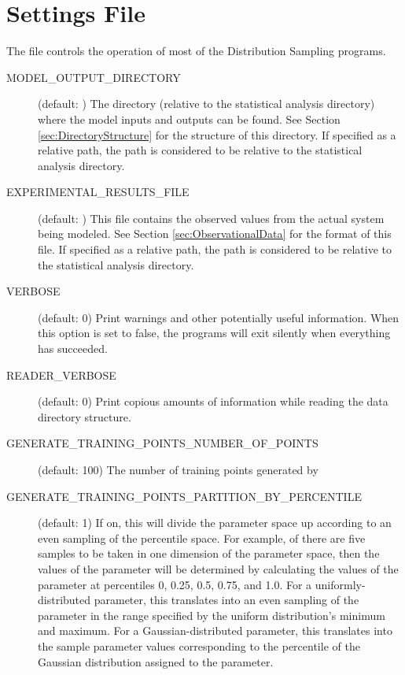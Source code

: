 
\section{Settings File}\label{sec:settings}

The file  controls the operation of most of the Distribution Sampling programs.

\begin{description}
    \item[MODEL\_OUTPUT\_DIRECTORY] (default: ) The directory (relative to the statistical analysis directory) where the model inputs and outputs can be found. See Section \ref{sec:DirectoryStructure} for the structure of this directory. If specified as a relative path, the path is considered to be relative to the statistical analysis directory.

    \item[EXPERIMENTAL\_RESULTS\_FILE] (default: ) This file contains the observed values from the actual system being modeled. See Section \ref{sec:ObservationalData} for the format of this file. If specified as a relative path, the path is considered to be relative to the statistical analysis directory.

    \item[VERBOSE] (default: 0) Print warnings and other potentially useful information. When this option is set to false, the programs will exit silently when everything has succeeded.

    \item[READER\_VERBOSE] (default: 0) Print copious amounts of information while reading the data directory structure.

    \item[GENERATE\_TRAINING\_POINTS\_NUMBER\_OF\_POINTS] (default: 100) The number of training points generated by 

    \item[GENERATE\_TRAINING\_POINTS\_PARTITION\_BY\_PERCENTILE] (default: 1) If on, this will divide the parameter space up according to an even sampling of the percentile space. For example, of there are five samples to be taken in one dimension of the parameter space, then the values of the parameter will be determined by calculating the values of the parameter at percentiles 0, 0.25, 0.5, 0.75, and 1.0. For a uniformly-distributed parameter, this translates into an even sampling of the parameter in the range specified by the uniform distribution's minimum and maximum. For a Gaussian-distributed parameter, this translates into the sample parameter values corresponding to the percentile of the Gaussian distribution assigned to the parameter. 


\end{description}
